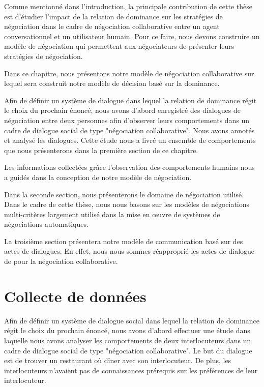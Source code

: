 	
	Comme mentionné dans l'introduction, la principale contribution de cette thèse est d'étudier l'impact de la relation de dominance sur les stratégies de négociation dans le cadre de négociation collaborative entre un agent conversationnel et un utilisateur humain. 
	Pour ce faire, nous devons construire un modèle de négociation qui permettent aux négociateurs de présenter leurs stratégies de négociation. 
	
	Dans ce chapitre, nous présentons notre modèle de négociation collaborative sur lequel sera construit notre modèle de décision basé sur la dominance. 
	
	Afin de définir un système de dialogue dans lequel la relation de dominance régit le choix du prochain énoncé, nous avons d'abord enregistré des dialogues de négociation entre deux personnes afin d'observer leurs comportements dans un cadre de dialogue social de type "négociation collaborative". Nous avons annotés et analysé les dialogues. Cette étude nous a livré un ensemble de comportements  que nous présenterons dans la première section de ce chapitre. 
	
	Les informations collectées grâce l'observation des comportements humains nous a guidés dans la conception de notre modèle de négociation.
	
	
	
	Dans la seconde section, nous présenterons le domaine de négociation utilisé. Dans le cadre de cette thèse, nous nous basons sur les modèles de négociations multi-critères largement utilisé dans la mise en œuvre de systèmes de négociations automatiques. 
	
	La troisième section présentera notre modèle de communication basé sur des actes de dialogues. En effet, nous nous sommes réapproprié les actes de dialogue de \cite{grosz1986attention} pour la négociation collaborative.
	
	
	 \section{Collecte de données}
		 Afin de définir un système de dialogue social dans lequel la relation de dominance régit le choix du prochain énoncé, nous avons d'abord effectuer une étude dans laquelle nous avons analyser les comportements de deux interlocuteurs dans un cadre de dialogue social de type "négociation collaborative". 
		Le but du dialogue est de trouver un restaurant où dîner avec son interlocuteur. De plus, les interlocuteurs n'avaient pas de connaissances prérequis sur les préférences de leur interlocuteur.
		
